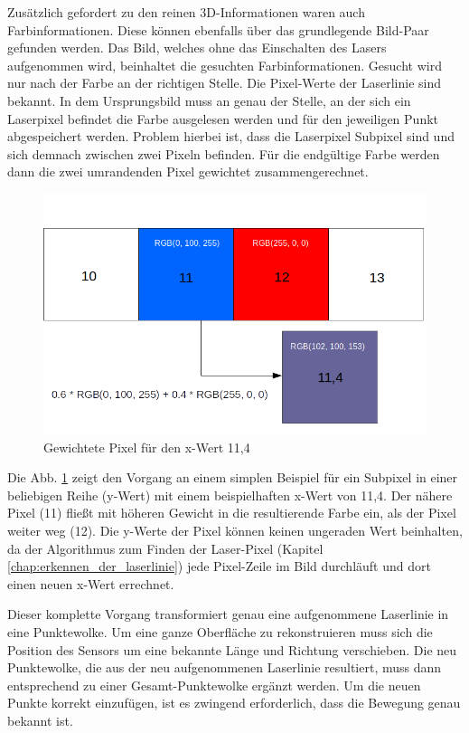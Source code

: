 	Zusätzlich gefordert zu den reinen 3D-Informationen waren auch Farbinformationen. Diese können ebenfalls über das grundlegende Bild-Paar gefunden werden. Das Bild, welches ohne das Einschalten des Lasers aufgenommen wird, beinhaltet die gesuchten Farbinformationen. Gesucht wird nur nach der Farbe an der richtigen Stelle. Die Pixel-Werte der Laserlinie sind bekannt. In dem Ursprungsbild muss an genau der Stelle, an der sich ein Laserpixel befindet die Farbe ausgelesen werden und für den jeweiligen Punkt abgespeichert werden. Problem hierbei ist, dass die Laserpixel Subpixel sind und sich demnach zwischen zwei Pixeln befinden. Für die endgültige Farbe werden dann die zwei umrandenden Pixel gewichtet zusammengerechnet.
	\begin{figure}[h]
		\centering
		\includegraphics[width=0.85\linewidth]{img/hauptteil/bildverarbeitung/weighted_pixel.png}
		\caption{Gewichtete Pixel für den x-Wert 11,4}
		\label{fig:weighted_pixel}
	\end{figure}

	Die Abb. \ref{fig:weighted_pixel} zeigt den Vorgang an einem simplen Beispiel für ein Subpixel in einer beliebigen Reihe (y-Wert) mit einem beispielhaften x-Wert von 11,4. Der nähere Pixel (11) fließt mit höheren Gewicht in die resultierende Farbe ein, als der Pixel weiter weg (12). Die y-Werte der Pixel können keinen ungeraden Wert beinhalten, da der Algorithmus zum Finden der Laser-Pixel (Kapitel \ref{chap:erkennen_der_laserlinie}) jede Pixel-Zeile im Bild durchläuft und dort einen neuen x-Wert errechnet.
	
	Dieser komplette Vorgang transformiert genau eine aufgenommene Laserlinie in eine Punktewolke. Um eine ganze Oberfläche zu rekonstruieren muss sich die Position des Sensors um eine bekannte Länge und Richtung verschieben. Die neu Punktewolke, die aus der neu aufgenommenen Laserlinie resultiert, muss dann entsprechend zu einer Gesamt-Punktewolke ergänzt werden. Um die neuen Punkte korrekt einzufügen, ist es zwingend erforderlich, dass die Bewegung genau bekannt ist. 
	
